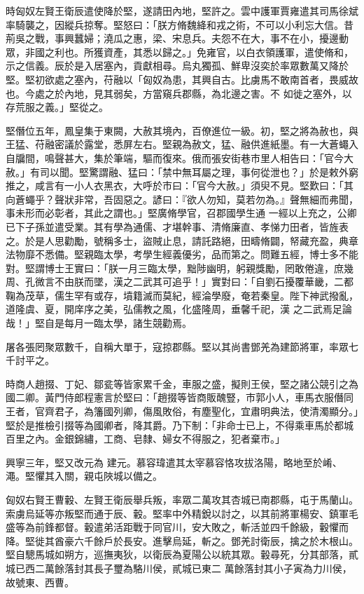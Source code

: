 \begin{pinyinscope}
 時匈奴左賢王衛辰遣使降於堅，遂請田內地，堅許之。雲中護軍賈雍遣其司馬徐斌率騎襲之，因縱兵掠奪。堅怒曰：「朕方脩魏絳和戎之術，不可以小利忘大信。昔荊吳之戰，事興蠶婦；澆瓜之惠，梁、宋息兵。夫怨不在大，事不在小，擾邊動眾，非國之利也。所獲資產，其悉以歸之。」免雍官，以白衣領護軍，遣使脩和，示之信義。辰於是入居塞內，貢獻相尋。烏丸獨孤、鮮卑沒奕於率眾數萬又降於堅。堅初欲處之塞內，苻融以「匈奴為患，其興自古。比虜馬不敢南首者，畏威故也。今處之於內地，見其弱矣，方當窺兵郡縣，為北邊之害。不
 如徙之塞外，以存荒服之義。」堅從之。



 堅僭位五年，鳳皇集于東闕，大赦其境內，百僚進位一級。初，堅之將為赦也，與王猛、苻融密議於露堂，悉屏左右。堅親為赦文，猛、融供進紙墨。有一大蒼蠅入自牖間，鳴聲甚大，集於筆端，驅而復來。俄而張安街巷市里人相告曰：「官今大赦。」有司以聞。堅驚謂融、猛曰：「禁中無耳屬之理，事何從泄也？」於是敕外窮推之，咸言有一小人衣黑衣，大呼於市曰：「官今大赦。」須臾不見。堅歎曰：「其向蒼蠅乎？聲狀非常，吾固惡之。諺曰：『欲人勿知，莫若勿為。』聲無細而弗聞，事未形而必彰者，其此之謂也。」堅廣脩學官，召郡國學生通
 一經以上充之，公卿已下子孫並遣受業。其有學為通儒、才堪幹事、清脩廉直、孝悌力田者，皆旌表之。於是人思勸勵，號稱多士，盜賊止息，請託路絕，田疇脩闢，帑藏充盈，典章法物靡不悉備。堅親臨太學，考學生經義優劣，品而第之。問難五經，博士多不能對。堅謂博士王實曰：「朕一月三臨太學，黜陟幽明，躬親獎勵，罔敢倦違，庶幾周、孔微言不由朕而墜，漢之二武其可追乎！」實對曰：「自劉石擾覆華畿，二都鞠為茂草，儒生罕有或存，墳籍滅而莫紀，經淪學廢，奄若秦皇。陛下神武撥亂，道隆虞、夏，開庠序之美，弘儒教之風，化盛隆周，垂馨千祀，漢
 之二武焉足論哉！」堅自是每月一臨太學，諸生競勸焉。



 屠各張罔聚眾數千，自稱大單于，寇掠郡縣。堅以其尚書鄧羌為建節將軍，率眾七千討平之。



 時商人趙掇、丁妃、鄒瓫等皆家累千金，車服之盛，擬則王侯，堅之諸公競引之為國二卿。黃門侍郎程憲言於堅曰：「趙掇等皆商販醜豎，市郭小人，車馬衣服僭同王者，官齊君子，為籓國列卿，傷風敗俗，有塵聖化，宜肅明典法，使清濁顯分。」堅於是推檢引掇等為國卿者，降其爵。乃下制：「非命士已上，不得乘車馬於都城百里之內。金銀錦繡，工商、皂隸、婦女不得服之，犯者棄市。」



 興寧三年，堅又改元為
 建元。慕容瑋遣其太宰慕容恪攻拔洛陽，略地至於崤、澠。堅懼其入關，親屯陜城以備之。



 匈奴右賢王曹轂、左賢王衛辰舉兵叛，率眾二萬攻其杏城已南郡縣，屯于馬蘭山。索虜烏延等亦叛堅而通于辰、轂。堅率中外精銳以討之，以其前將軍楊安、鎮軍毛盛等為前鋒都督。轂遣弟活距戰于同官川，安大敗之，斬活並四千餘級，轂懼而降。堅徙其酋豪六千餘戶於長安。進擊烏延，斬之。鄧羌討衛辰，擒之於木根山。堅自驄馬城如朔方，巡撫夷狄，以衛辰為夏陽公以統其眾。轂尋死，分其部落，貳城已西二萬餘落封其長子璽為駱川侯，貳城已東二
 萬餘落封其小子寅為力川侯，故號東、西曹。




\end{pinyinscope}
